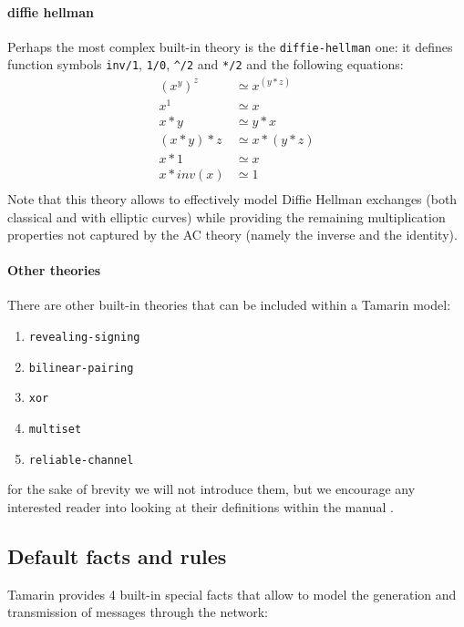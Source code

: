 \documentclass[fleqn,10pt]{SelfArx} %
\newcounter{definition}[section]\setcounter{definition}{0}
\begin{document}
\paragraph{diffie hellman}
Perhaps the most complex built-in theory is the \lstinline|diffie-hellman| one: it defines function symbols \lstinline|inv/1|, \lstinline|1/0|, \lstinline|^/2| and \lstinline|*/2| and the following equations:
\begin{align*}
    (x^y)^z  &\simeq x^{(y*z)}\\
    x^1      &\simeq x\\
    x*y      &\simeq y*x\\
    (x*y)*z  &\simeq x*(y*z)\\
    x*1      &\simeq x\\
    x*inv(x) &\simeq 1\\
\end{align*}
Note that this theory allows to effectively model Diffie Hellman exchanges (both classical and with elliptic curves) while providing the remaining multiplication properties not captured by the AC theory (namely the inverse and the identity).

\paragraph{Other theories}
There are other built-in theories that can be included within a Tamarin model:

\begin{enumerate}
    \item \lstinline|revealing-signing|
    \item \lstinline|bilinear-pairing|
    \item \lstinline|xor|
    \item \lstinline|multiset|
    \item \lstinline|reliable-channel|
\end{enumerate}

for the sake of brevity we will not introduce them, but we encourage any interested reader into looking at their definitions within the manual \cite{tamarinManual}.

\subsection{Default facts and rules}\label{subsec:DefaultFacts}

Tamarin provides 4 built-in special facts that allow to model the generation and transmission of messages through the network:
\end{document}
